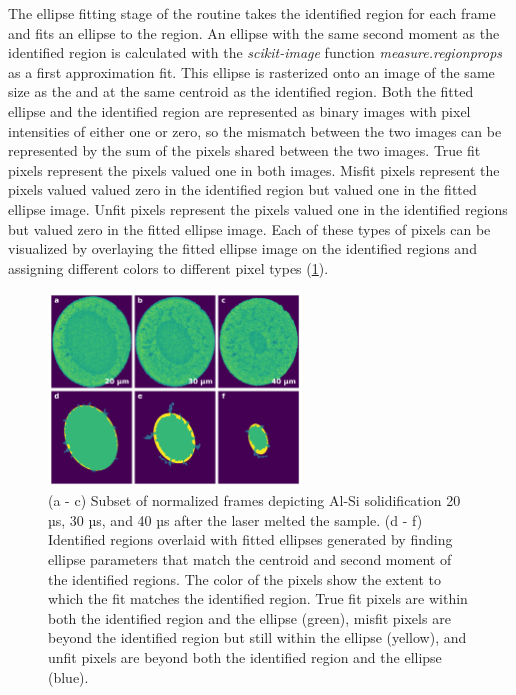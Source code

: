 The ellipse fitting stage of the routine takes the identified region for
each frame and fits an ellipse to the region. An ellipse with the same
second moment as the identified region is calculated with the
\textit{scikit-image}
function \textit{measure.regionprops} as a first approximation fit. This
ellipse is rasterized onto an image of the same size as the
and at the same centroid as the identified region.
Both the fitted ellipse and the identified region are represented as binary
images with pixel intensities of either one or zero, so the mismatch
between the two images can be represented by the sum of the pixels shared
between the two images.
True fit pixels represent the pixels valued one in both images.
Misfit pixels represent the pixels valued valued zero in the
identified region but valued one in the fitted ellipse image.
Unfit pixels represent the pixels valued one in the identified regions but
valued zero in the fitted ellipse image.
Each of these types of pixels can be visualized by overlaying the fitted
ellipse image on the identified regions
and assigning different colors to different pixel types
(\ref{fig/rescaled-nonoptim}).

\begin{figure}[ht]
    \centering
    \includegraphics[width=0.6\textwidth]{figures/04/09-rescaled-nonoptim-fit.png}
    \caption{
        \small{}
        (a - c) Subset of normalized frames depicting Al-Si solidification
        20 µs, 30 µs, and 40 µs after the laser melted the sample.
        (d - f) Identified regions overlaid with fitted ellipses generated by
        finding ellipse parameters that match the centroid and second
        moment of the identified regions. The color of the pixels show the
        extent to which the fit matches the identified region.
        True fit pixels are within both the identified region and
        the ellipse (green), misfit pixels are beyond the identified
        region but still within the ellipse (yellow), and unfit pixels are
        beyond both the identified region and the ellipse (blue).
    }
    \label{fig/rescaled-nonoptim}
\end{figure}

